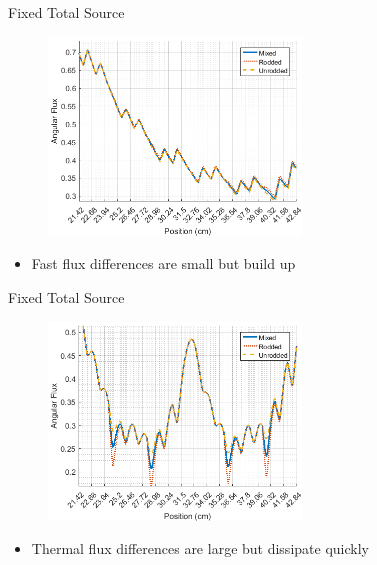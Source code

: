 \begin{frame}[t]{Fixed Total Source}

\begin{figure}[H]
    \centering
    \includegraphics[width=0.6\textwidth]{../figs/1dmoc-50mix-fixedscat-angflux1.png}
\end{figure}
\begin{itemize}
  \item Fast flux differences are small but build up
\end{itemize}

\end{frame}


\begin{frame}[t]{Fixed Total Source}

\begin{figure}[H]
  \centering
  \includegraphics[width=0.6\textwidth]{../figs/1dmoc-50mix-fixedscat-angflux7.png}
\end{figure}
\begin{itemize}
  \item Thermal flux differences are large but dissipate quickly
\end{itemize}

\end{frame}

